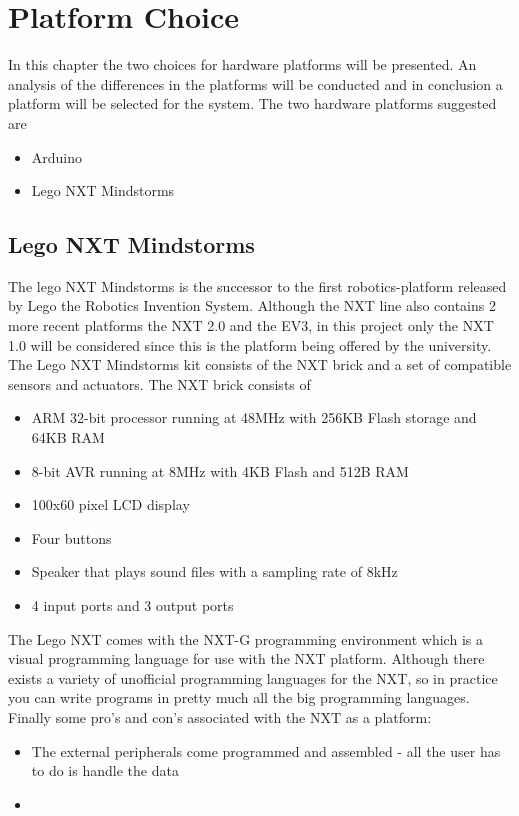 \chapter{Platform Choice}
In this chapter the two choices for hardware platforms will be presented. An analysis of the differences in the platforms will be conducted and in conclusion a platform will be selected for the system. The two hardware platforms suggested are
\begin{itemize}
	\item Arduino
	\item Lego NXT Mindstorms
\end{itemize}

\section{Lego NXT Mindstorms}
The lego NXT Mindstorms is the successor to the first robotics-platform released by Lego the Robotics Invention System.
Although the NXT line also contains 2 more recent platforms the NXT 2.0 and the EV3, in this project only the NXT 1.0 will be considered
since this is the platform being offered by the university.\nl
The Lego NXT Mindstorms kit consists of the NXT brick and a set of compatible sensors and actuators.\nl
The NXT brick consists of
\begin{itemize}
  \item ARM 32-bit processor running at 48MHz with 256KB Flash storage and 64KB RAM
  \item 8-bit AVR running at 8MHz with 4KB Flash and 512B RAM
  \item 100x60 pixel LCD display
  \item Four buttons
  \item Speaker that plays sound files with a sampling rate of 8kHz
  \item 4 input ports and 3 output ports
\end{itemize}
The Lego NXT comes with the NXT-G programming environment which is a visual programming language for use with the NXT platform.
Although there exists a variety of unofficial programming languages for the NXT, so in practice you can write programs
in pretty much all the big programming languages.
Finally some pro's and con's associated with the NXT as a platform:
\begin{itemize}
  \item The external peripherals come programmed and assembled - all the user has to do is handle the data
  \item
\end{itemize}
